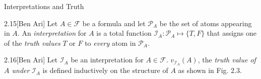 \begin{slide}[bm=,toc=]{Interpretations and Truth}
\begin{defn}{2.15}[Ben Ari]
Let $A \in \mathcal{F}$ be a formula and let $\mathcal{P}_A$ be the
  set of atoms appearing in $A$. An \emph{interpretation} for $A$ is a 
total function $\mathcal{I}_A: \mathcal{P}_A \mapsto \{T,F\}$ that assigns
one of the \emph{truth values} $T$ or $F$ to \emph{every} atom in
$\mathcal{P}_A$.
\end{defn}
\begin{defn}{2.16}[Ben Ari]
Let $\mathcal{I}_A$ be an interpretation for $A \in \mathcal{F}$.
$v_{\mathcal{I}_A}(A)$, the \emph{truth value of $A$ under} $\mathcal{I}_A$
is defined inductively on the structure of $A$ as shown in Fig. $2.3$.
\end{defn}
\end{slide}

